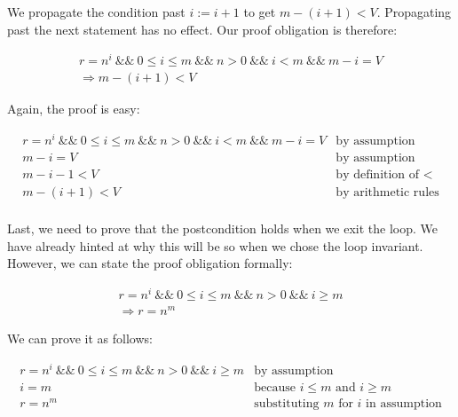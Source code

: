 \documentclass[11pt]{article}
\begin{document}
    We propagate the condition past $i:=i+1$ to get $m-(i+1) < V$. Propagating
    past the next statement has no effect. Our proof obligation is therefore:

    \[
        \begin{array}{l}
            r=n^i ~\&\&~ 0 \le i \le m ~\&\&~ n > 0 ~\&\&~ i < m ~\&\&~ m-i = V\\
            \Rightarrow m-(i+1) < V
        \end{array}
    \]

    Again, the proof is easy:

    \[
        \begin{array}{ll}
            r=n^i ~\&\&~ 0 \le i \le m ~\&\&~ n > 0 ~\&\&~ i < m ~\&\&~ m-i = V & \mbox{by assumption}\\
            m-i = V & \mbox{by assumption}\\
            m-i-1 < V & \mbox{by definition of $<$}\\
            m-(i+1) < V & \mbox{by arithmetic rules}\\
        \end{array}
    \]

    Last, we need to prove that the postcondition holds when we exit the
    loop. We have already hinted at why this will be so when we chose the
    loop invariant. However, we can state the proof obligation formally:

    \[
        \begin{array}{l}
            r=n^i ~\&\&~ 0 \le i \le m ~\&\&~ n > 0 ~\&\&~ i \ge m\\
            \Rightarrow r=n^m
        \end{array}
    \]

    We can prove it as follows:

    \[
        \begin{array}{ll}
            r=n^i ~\&\&~ 0 \le i \le m ~\&\&~ n > 0 ~\&\&~ i \ge m & \mbox{by assumption}\\
            i = m & \mbox{because $i \le m$ and $i \ge m$}\\
            r=n^m & \mbox{substituting $m$ for $i$ in assumption}\\
        \end{array}
    \]
\end{document}
